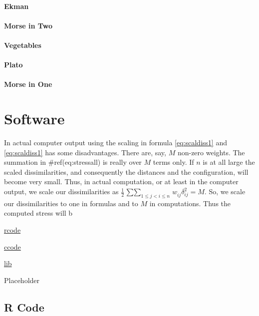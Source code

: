 \documentclass[
  12pt,
]{book}
\begin{document}
\subsubsection{Ekman}\label{ekman-1}

\subsubsection{Morse in Two}\label{morse-in-two}

\subsubsection{Vegetables}\label{vegetables}

\subsubsection{Plato}\label{plato}

\subsubsection{Morse in One}\label{morse-in-one}

\chapter{Software}\label{chsoftware}

In actual computer output using the scaling in formula \eqref{eq:scaldiss1} and \eqref{eq:scaldiss1} has some disadvantages. There are, say, \(M\) non-zero weights. The summation in \#ref(eq:stressall) is really over \(M\) terms only. If \(n\) is at all large the scaled dissimilarities, and consequently the distances and the configuration, will become very small. Thus, in actual computation, or at least in the computer output, we scale our dissimilarities as \(\frac12\mathop{\sum\sum}_{1\leq j<i\leq n} w_{ij}^{\ }\delta_{ij}^2=M\). So, we scale our dissimilarities to one in formulas and to \(M\) in computations. Thus the computed stress will b

\href{https://github.com/deleeuw/stress/tree/main/rcode/}{rcode}

\href{https://github.com/deleeuw/stress/tree/main/ccode/}{ccode}

\href{https://github.com/deleeuw/stress/tree/main/lib/}{lib}

\appendix


Placeholder

\section{R Code}\label{rapcode}
\end{document}
